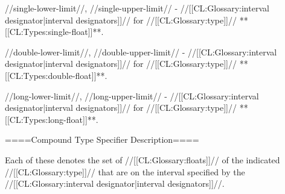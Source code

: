 //single-lower-limit//, //single-upper-limit// - //[[CL:Glossary:interval designator|interval designators]]// for //[[CL:Glossary:type]]// **[[CL:Types:single-float]]**. 

//double-lower-limit//, //double-upper-limit// - //[[CL:Glossary:interval designator|interval designators]]// for //[[CL:Glossary:type]]// **[[CL:Types:double-float]]**. 

//long-lower-limit//, //long-upper-limit// - //[[CL:Glossary:interval designator|interval designators]]// for //[[CL:Glossary:type]]// **[[CL:Types:long-float]]**. 

====Compound Type Specifier Description====

Each of these denotes the set of //[[CL:Glossary:floats]]// of the indicated //[[CL:Glossary:type]]// that are on the interval specified by the //[[CL:Glossary:interval designator|interval designators]]//.

   
